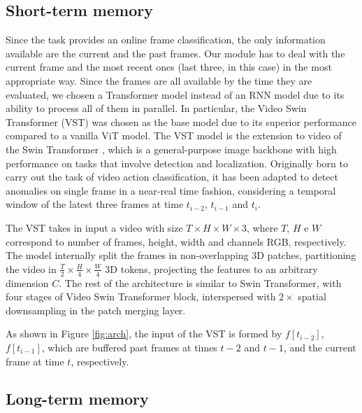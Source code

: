 \subsection{Short-term memory}

Since the task provides an online frame classification, the only information available are the current and the past frames.
Our module has to deal with the current frame and the most recent ones (last three, in this case) in the most appropriate way.
Since the frames are all available by the time they are evaluated, we chosen a Transformer model instead of an RNN model due to its ability to process all of them in parallel.
In particular, the Video Swin Transformer (VST) \cite{liu_video_2022} was chosen as the base model due to its superior performance compared to a vanilla ViT \cite{DBLP:conf/iclr/DosovitskiyB0WZ21} model.
The VST model is the extension to video of the Swin Transformer \cite{liu2021Swin}, which is a general-purpose image backbone with high performance on tasks that involve detection and localization.
Originally born to carry out the task of video action classification, it has been adapted to detect anomalies on single frame in a near-real time fashion, considering a temporal window of the latest three frames at time $t_{i-2}$, $t_{i-1}$ and $t_{i}$.

The VST takes in input a video with size $T \times H \times W \times 3$, where $T$, $H$ e $W$ correspond to number of frames, height, width and channels RGB, respectively.
The model internally split the frames in non-overlapping 3D patches, partitioning the video in $\frac{T}{2} \times \frac{H}{4} \times \frac{W}{4}$ 3D tokens, projecting the features to an arbitrary dimension $C$.
The rest of the architecture is similar to Swin Transformer, with four stages of Video Swin Transformer block, interspersed with $2\times$ spatial downsampling in the patch merging layer.

As shown in Figure \ref{fig:arch}, the input of the VST is formed by $f[t_{i-2}]$, $f[t_{i-1}]$, which are buffered past frames at times $t-2$ and $t-1$, and the current frame at time $t$, respectively.

\subsection{Long-term memory}

